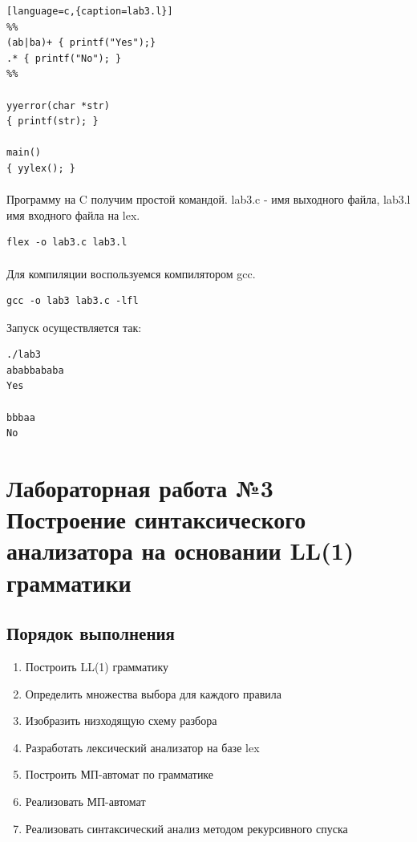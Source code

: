 \documentclass[a4paper,12pt]{article}
\begin{document}
\begin{lstlisting}[language=c,{caption=lab3.l}]
%%
(ab|ba)+ { printf("Yes");}
.* { printf("No"); }
%%

yyerror(char *str)
{ printf(str); }

main()
{ yylex(); }
\end{lstlisting}

\paragraph{}
Программу на C получим простой командой. lab3.c - имя выходного файла, lab3.l имя входного файла на lex.

\begin{verbatim}
flex -o lab3.c lab3.l
\end{verbatim}

\paragraph{}
Для компиляции воспользуемся компилятором gcc.
\begin{verbatim}
gcc -o lab3 lab3.c -lfl
\end{verbatim}

Запуск осуществляется так:
\begin{verbatim}
./lab3
ababbababa
Yes

bbbaa
No	
\end{verbatim}

\newpage

\section{Лабораторная работа №3\\
	Построение синтаксического анализатора на основании LL(1) грамматики}

\subsection{Порядок выполнения}
\begin{enumerate}
	\item Построить LL(1) грамматику
	\item Определить множества выбора для каждого правила
	\item Изобразить низходящую схему разбора
	\item Разработать лексический анализатор на базе lex
	\item Построить МП-автомат по грамматике
	\item Реализовать МП-автомат
	\item Реализовать синтаксический анализ методом рекурсивного спуска	
\end{enumerate}
\end{document}
